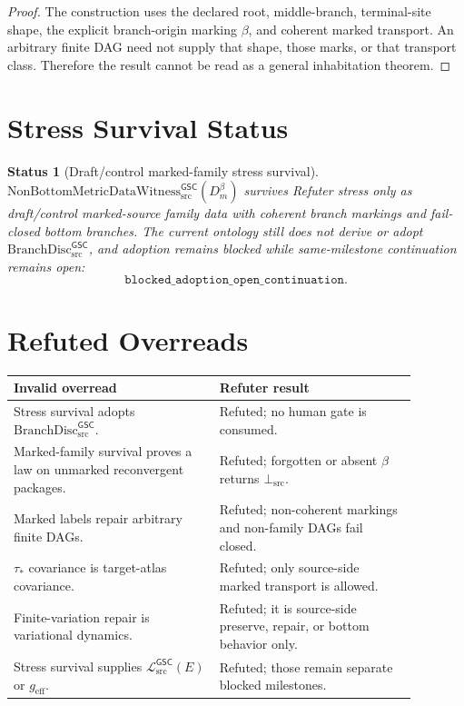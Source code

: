 \documentclass[11pt]{article}
\newcommand{\Witness}{\mathrm{NonBottomMetricDataWitness}_{\mathrm{src}}^{\mathsf{GSC}}}
\newcommand{\MetricData}{\mathcal{L}_{\mathrm{src}}^{\mathsf{GSC}}}
\newcommand{\BottomSrc}{\bot_{\mathrm{src}}}
\newcommand{\geff}{g_{\mathrm{eff}}}
\newcommand{\BranchDisc}{\mathrm{BranchDisc}_{\mathrm{src}}^{\mathsf{GSC}}}
\newcommand{\Dmbeta}{D_m^{\beta}}
\newtheorem{status}{Status}
\begin{document}
\begin{proof}
The construction uses the declared root, middle-branch, terminal-site shape,
the explicit branch-origin marking \(\beta\), and coherent marked transport.
An arbitrary finite DAG need not supply that shape, those marks, or that
transport class. Therefore the result cannot be read as a general
inhabitation theorem.
\end{proof}

\section{Stress Survival Status}

\begin{status}[Draft/control marked-family stress survival]
\(\Witness(\Dmbeta)\) survives Refuter stress only as draft/control
marked-source family data with coherent branch markings and fail-closed bottom
branches. The current ontology still does not derive or adopt
\(\BranchDisc\), and adoption remains blocked while same-milestone
continuation remains open:
\[
  \texttt{blocked\_adoption\_open\_continuation}.
\]
\end{status}

\section{Refuted Overreads}

\begin{center}
\begin{tabular}{p{0.45\linewidth}p{0.43\linewidth}}
\toprule
Invalid overread & Refuter result \\
\midrule
Stress survival adopts \(\BranchDisc\). &
Refuted; no human gate is consumed. \\
Marked-family survival proves a law on unmarked reconvergent packages. &
Refuted; forgotten or absent \(\beta\) returns \(\BottomSrc\). \\
Marked labels repair arbitrary finite DAGs. &
Refuted; non-coherent markings and non-family DAGs fail closed. \\
\(\tau_\ast\) covariance is target-atlas covariance. &
Refuted; only source-side marked transport is allowed. \\
Finite-variation repair is variational dynamics. &
Refuted; it is source-side preserve, repair, or bottom behavior only. \\
Stress survival supplies \(\MetricData(E)\) or \(\geff\). &
Refuted; those remain separate blocked milestones. \\
\bottomrule
\end{tabular}
\end{center}
\end{document}
